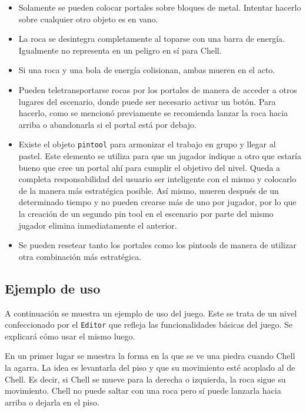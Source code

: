 \documentclass[a4paper]{article}
\begin{document}
\begin{itemize}
	\item Solamente se pueden colocar portales sobre bloques de metal. Intentar hacerlo sobre cualquier otro objeto es en vano.
	
	\item La roca se desintegra completamente al toparse con una barra de energía. Igualmente no representa en un peligro en sí para Chell.
	
	\item Si una roca y una bola de energía colisionan, ambas mueren en el acto.
	
	\item Pueden teletransportarse rocas por los portales de manera de acceder a otros lugares del escenario, donde puede ser necesario activar un botón. Para hacerlo, como se mencionó previamente se recomienda lanzar la roca hacia arriba o abandonarla si el portal está por debajo.
	
	\item Existe el objeto \texttt{pintool} para armonizar el trabajo en grupo y llegar al pastel. Este elemento se utiliza para que un jugador indique a otro que estaría bueno que cree un portal ahí para cumplir el objetivo del nivel. Queda a completa responsabilidad del usuario ser inteligente con el mismo y colocarlo de la manera más estratégica posible. Así mismo, mueren después de un determinado tiempo y no pueden crearse más de uno por jugador, por lo que la creación de un segundo pin tool en el escenario por parte del mismo jugador elimina inmediatamente el anterior.
	
	\item Se pueden resetear tanto los portales como los pintools de manera de utilizar otra combinación más estratégica.
\end{itemize}

\subsection{Ejemplo de uso}

A continuación se muestra un ejemplo de uso del juego. Este se trata de un nivel confeccionado por el \texttt{Editor} que refleja las funcionalidades básicas del juego. Se explicará cómo usar el mismo luego.

En un primer lugar se muestra la forma en la que se ve una piedra cuando Chell la agarra. La idea es levantarla del piso y que su movimiento esté acoplado al de Chell. Es decir, si Chell se mueve para la derecha o izquierda, la roca sigue su movimiento. Chell no puede saltar con una roca pero sí puede lanzarla hacia arriba o dejarla en el piso.
\end{document}

